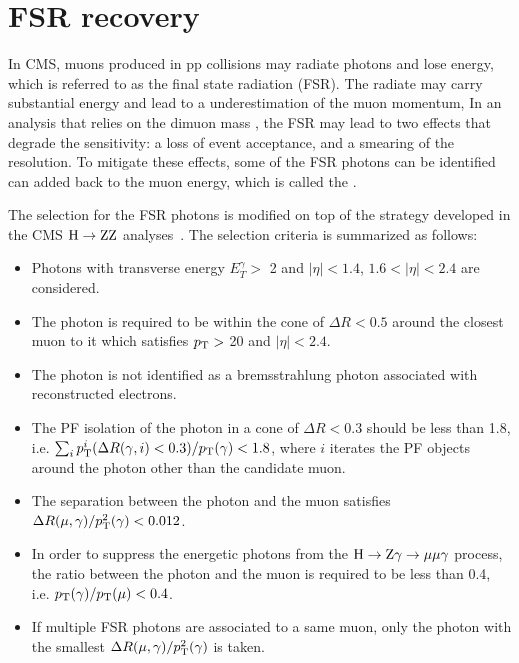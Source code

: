 \section{FSR recovery} \label{sec:fsr}

In CMS, muons produced in pp collisions may radiate photons and lose energy, which is referred to as the final state radiation (FSR).
The radiate may carry substantial energy and lead to a underestimation of the muon momentum,
In an analysis that relies on the dimuon mass \mmm, the FSR may lead to two effects that degrade the sensitivity:
a loss of event acceptance, and a smearing of the \mmm resolution.
To mitigate these effects, some of the FSR photons can be identified can added back to the muon energy, which is called the \FSR.

The selection for the FSR photons is modified on top of the strategy developed in the CMS $\mathrm{H} \to \mathrm{Z}\mathrm{Z}$ analyses~\cite{Sirunyan:2017exp, Sirunyan:2018qlb}.
The selection criteria is summarized as follows:
\begin{itemize}
  \item Photons with transverse energy $E^{\gamma}_{T} > $ 2 \GeV and $|\eta|<1.4$, $1.6<|\eta|<2.4$ are considered.
  \item The photon is required to be within the cone of $\Delta{}R<0.5$ around the closest muon to it which satisfies $p_{\mathrm{T}} >$ 20 \GeV and $|\eta| < 2.4$.
  \item The photon is not identified as a bremsstrahlung photon associated with reconstructed electrons.
  \item The PF isolation of the photon in a cone of $\Delta{}R < 0.3$ should be less than 1.8, i.e. $\sum_{i}p_{\mathrm{T}}^{i}(\Delta{}R(\gamma, i)<0.3)/p_{\mathrm{T}}(\gamma) < 1.8$, 
        where $i$ iterates the PF objects around the photon other than the candidate muon.
  \item The separation between the photon and the muon satisfies $\Delta{}R(\mu, \gamma)/p_{\mathrm{T}}^{2}(\gamma) < 0.012$.
  \item In order to suppress the energetic photons from the $\mathrm{H} \to \mathrm{Z}\gamma \to \mu\mu\gamma$ process,
        the \pt ratio between the photon and the muon is required to be less than 0.4, i.e. $p_{\mathrm{T}}(\gamma)/p_{\mathrm{T}}(\mu) < 0.4$.
  \item If multiple FSR photons are associated to a same muon, only the photon with the smallest $\Delta{}R(\mu, \gamma)/p_{\mathrm{T}}^{2}(\gamma)$ is taken.
\end{itemize}

